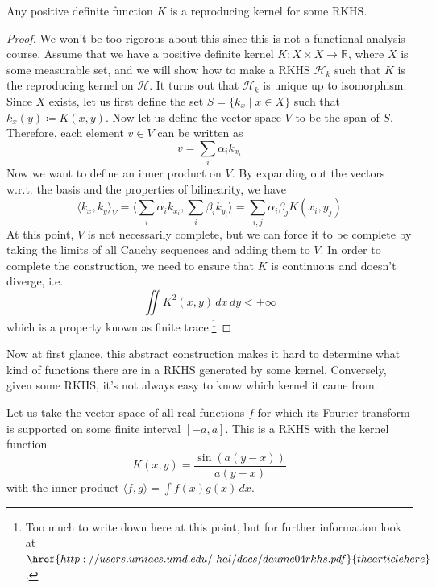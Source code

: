 \documentclass{article}
\begin{document}
    \begin{theorem} 
      Any positive definite function $K$ is a reproducing kernel for some RKHS.  
    \end{theorem} 
    \begin{proof} 
      We won't be too rigorous about this since this is not a functional analysis course. Assume that we have a positive definite kernel $K: X \times X \rightarrow \mathbb{R}$, where $X$ is some measurable set, and we will show how to make a RKHS $\mathcal{H}_k$ such that $K$ is the reproducing kernel on $\mathcal{H}$. It turns out that $\mathcal{H}_k$ is unique up to isomorphism. Since $X$ exists, let us first define the set $S = \{ k_x \mid x \in X\}$ such that $k_x (y) \coloneqq K(x, y)$. Now let us define the vector space $V$ to be the span of $S$. Therefore, each element $v \in V$ can be written as 
      \[v = \sum_i \alpha_i k_{x_i}\]
      Now we want to define an inner product on $V$. By expanding out the vectors w.r.t. the basis and the properties of bilinearity, we have 
      \[\langle k_x, k_y \rangle_{V} = \bigg\langle \sum_i \alpha_i k_{x_i} , \sum_i \beta_i k_{y_i} \bigg\rangle = \sum_{i, j} \alpha_i \beta_j K(x_i, y_j)\] 
      At this point, $V$ is not necessarily complete, but we can force it to be complete by taking the limits of all Cauchy sequences and adding them to $V$. In order to complete the construction, we need to ensure that $K$ is continuous and doesn't diverge, i.e. 
      \[\iint K^2 (x, y) \,dx\,dy < +\infty\]
      which is a property known as finite trace.\footnote{Too much to write down here at this point, but for further information look at $\href{http://users.umiacs.umd.edu/~hal/docs/daume04rkhs.pdf}{the article here}$.}
    \end{proof}

    Now at first glance, this abstract construction makes it hard to determine what kind of functions there are in a RKHS generated by some kernel. Conversely, given some RKHS, it's not always easy to know which kernel it came from. 

    \begin{example}
      Let us take the vector space of all real functions $f$ for which its Fourier transform is supported on some finite interval $[-a, a]$. This is a RKHS with the kernel function 
      \begin{equation}
        K(x, y) = \frac{\sin(a(y - x))}{a(y - x)}
      \end{equation}
      with the inner product $\langle f, g \rangle = \int f(x) g(x) \,dx$.
    \end{example}
\end{document}
